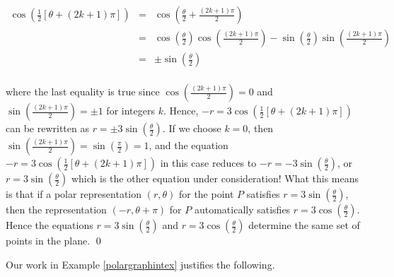 \begin{ex}
\begin{enumerate}
\[ \begin{array}{rcl}

\cos\left(\frac{1}{2}\left[ \theta + (2k+1)\pi\right]\right) &  = &  \cos\left(\frac{\theta}{2} + \frac{(2k+1)\pi}{2} \right) \\[3pt]
                                                         & =  & \cos\left(\frac{\theta}{2}\right) \cos\left(\frac{(2k+1)\pi}{2}\right) - \sin\left(\frac{\theta}{2}\right) \sin\left(\frac{(2k+1)\pi}{2}\right) \\[3pt]
                                                         & = & \pm \sin\left(\frac{\theta}{2}\right) \\ \end{array}\]
                                                         
where the last equality is true  since $\cos\left(\frac{(2k+1)\pi}{2}\right) = 0$ and $\sin\left(\frac{(2k+1)\pi}{2}\right) = \pm 1$ for integers $k$.   Hence,   $-r = 3\cos\left(\frac{1}{2}\left[ \theta + (2k+1)\pi\right]\right)$ can be rewritten as $r = \pm 3 \sin\left(\frac{\theta}{2}\right)$.  If we choose $k = 0$, then  $\sin\left(\frac{(2k+1)\pi}{2}\right) = \sin\left(\frac{\pi}{2}\right)= 1$, and the equation  $-r = 3\cos\left(\frac{1}{2}\left[ \theta + (2k+1)\pi\right]\right)$ in this case reduces to $-r = -3\sin\left(\frac{\theta}{2}\right)$, or $r = 3\sin\left(\frac{\theta}{2}\right)$ which is the other equation under consideration! What this means is that if a polar representation $(r,\theta)$ for the point $P$ satisfies $r = 3\sin(\frac{\theta}{2})$, then the representation  $(-r, \theta + \pi)$ for $P$ automatically satisfies $r = 3\cos\left(\frac{\theta}{2}\right)$.  Hence the equations $r = 3\sin(\frac{\theta}{2})$ and $r = 3\cos(\frac{\theta}{2})$ determine the same set of points in the plane. \qed

\end{enumerate}

\end{ex}

Our work in Example \ref{polargraphintex} justifies the following.

\medskip

